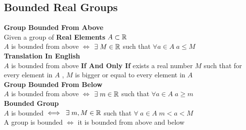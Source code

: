 \subsection{Bounded Real Groups}
\textbf{Group Bounded From Above}\\
Given a group of \textbf{Real Elements} $A\subset \mathbb{R}$\\
$A$ is bounded from above $\iff$ $\exists\; M\in \mathbb{R}$ such that $\forall a\in A\;  a\leq M$\\
\textbf{Translation In English}\\
$A$ is bounded from above \textbf{If And Only If} exists a real number $M$ such that for every element in $A$ , $M$ is bigger or equal to every element in $A$\\
\textbf{Group Bounded From Below}\\
$A$ is bounded from above $\iff$ $\exists\; m\in \mathbb{R}$ such that $\forall a\in A\;  a\geq m$\\
\textbf{Bounded Group}\\
$A$ is bounded $\iff\; \exists \; m,M \in \mathbb{R}$ such that $\forall \; a\in A \; m<a<M$\\
A group is bounded $\iff$ it is bounded from above and below\\

